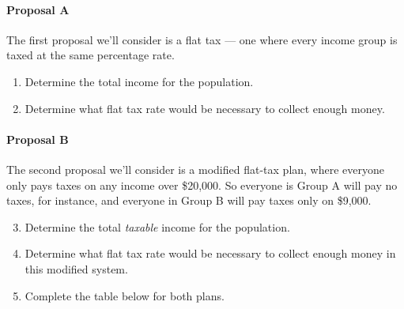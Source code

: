 \begin{exercises}
{\paragraph{Proposal A} The first proposal we'll consider is a flat tax --- one where every income group is taxed at the same percentage rate.
\begin{enumerate}[1)]
\item Determine the total income for the population.
\vspace{1in}

\item Determine what flat tax rate would be necessary to collect enough money.
\vspace{1in}
\end{enumerate}

\paragraph{Proposal B} The second proposal we'll consider is a modified flat-tax plan, where everyone only pays taxes on any income over \$20,000.  So everyone is Group A will pay no taxes, for instance, and everyone in Group B will pay taxes only on \$9,000.
\begin{enumerate}[1)]
\setcounter{enumi}{2}
\item Determine the total \textit{taxable} income for the population.
\vspace{1in}

\item Determine what flat tax rate would be necessary to collect enough money in this modified system.
\end{enumerate}
}
\vfill
\pagebreak

\begin{minipage}[t]{\textwidth}
\begin{enumerate}[1)]
\setcounter{enumi}{4}
\item Complete the table below for both plans.
\end{enumerate}


\end{minipage}
\end{exercises}
